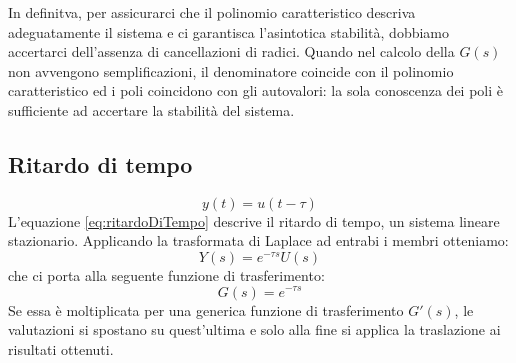 \documentclass[a4paper]{report}
\begin{document}
In definitva, per assicurarci che il polinomio caratteristico descriva
adeguatamente il sistema e ci garantisca l'asintotica stabilit\`a,
dobbiamo accertarci dell'assenza di cancellazioni di radici. Quando
nel calcolo della $G(s)$ non avvengono semplificazioni, il
denominatore coincide con il polinomio caratteristico ed i poli
coincidono con gli autovalori: la sola conoscenza dei poli \`e
sufficiente ad accertare la stabilit\`a del sistema.

\subsection{Ritardo di tempo}
\begin{equation}\label{eq:ritardoDiTempo}
  y(t) = u(t - \tau)
\end{equation}
L'equazione \ref{eq:ritardoDiTempo} descrive il ritardo di tempo, un
sistema lineare stazionario. Applicando la trasformata di Laplace ad
entrabi i membri otteniamo:
\[
  Y(s) = e^{- \tau s} U(s)
\]
che ci porta alla seguente funzione di trasferimento:
\[
  G(s) = e^{- \tau s}
\]
Se essa \`e moltiplicata per una generica funzione di trasferimento
$G'(s)$, le valutazioni si spostano su quest'ultima e solo alla fine
si applica la traslazione ai risultati ottenuti.
\end{document}
